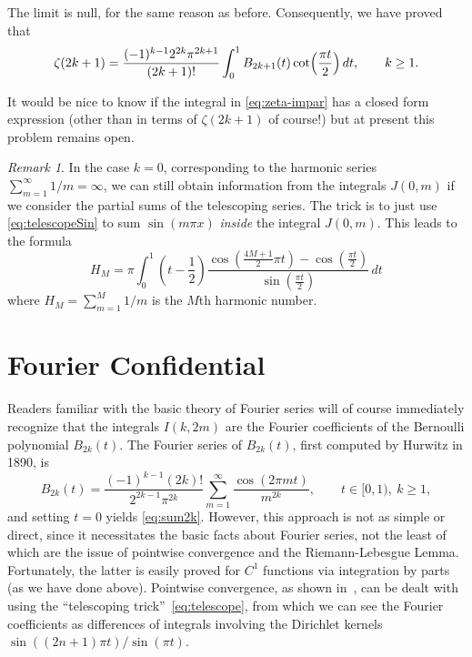 \documentclass[10pt,reqno]{amsart}
\theoremstyle{remark}
\newtheorem*{rem}{Remark}
\begin{document}
The limit is null, for the same reason as before. Consequently, we have proved that
%
\begin{equation}
\label{eq:zeta-impar}
  \zeta(2k+1) = \frac{(-1)^{k-1}2^{2k}\pi^{2k+1}}{(2k+1)!}
  \int_0^{1} B_{2k+1}(t) \cot\Bigl(\frac{\pi t}{2}\Bigr)\,dt,
  \qquad k  \geq 1.
\end{equation}
%

It would be nice to know if the integral in \eqref{eq:zeta-impar} has a closed form expression (other than in terms of $\zeta(2k+1)$ of course!) but at present this problem remains open.


\begin{rem}
In the case $k=0$, corresponding to the harmonic series $\sum_{m=1}^{\infty} 1/m = \infty$, we can still obtain information from the integrals $J(0,m)$ if we consider the partial sums of the telescoping series.
The trick is to just use \eqref{eq:telescopeSin} to sum $\sin(m \pi x)$ \emph{inside} the integral $J(0,m)$. 
This leads to the formula
%
\begin{equation}
\label{eq:harmonic}
  H_{M}
 = \pi \int_{0}^{1} \left(t - \frac{1}{2}\right) \frac{\cos\left(\frac{4M+1}{2} \pi t\right) 
  - \cos\left(\frac{\pi t}{2}\right)}{\sin\left(\frac{\pi t}{2}\right)} \, dt
\end{equation}
%
where $H_{M} = \sum_{m=1}^{M} {1}/{m}$ is the $M$th harmonic number.
\end{rem}

\section{Fourier Confidential}

Readers familiar with the basic theory of Fourier series will of course immediately recognize that the integrals $I(k,2m)$ are the Fourier coefficients of the Bernoulli polynomial $B_{2k}(t)$. The Fourier series of $B_{2k}(t)$, first computed by Hurwitz in 1890, is
\[
 B_{2k}(t) = \frac{(-1)^{k-1}(2k)!}{2^{2k-1} \pi^{2k}} 
 \sum_{m=1}^{\infty} \frac{\cos(2 \pi m t)}{m^{2k}},
 \qquad
 t \in [0,1),
 \ k \geq 1,
\]
and setting $t = 0$ yields \eqref{eq:sum2k}. However, this approach is not as simple or direct, since it necessitates the basic facts about Fourier series, not the least of which are the issue of pointwise convergence and the Riemann-Lebesgue Lemma. Fortunately, the latter is easily proved for $C^{1}$ functions via integration by parts (as we have done above). Pointwise convergence, as shown in~\cite{Cher}, can be dealt with using the ``telescoping trick''~\eqref{eq:telescope}, from which we can see the Fourier coefficients as differences of integrals involving the Dirichlet kernels $\sin((2n+1)\pi t)/\sin(\pi t)$.
\end{document}
